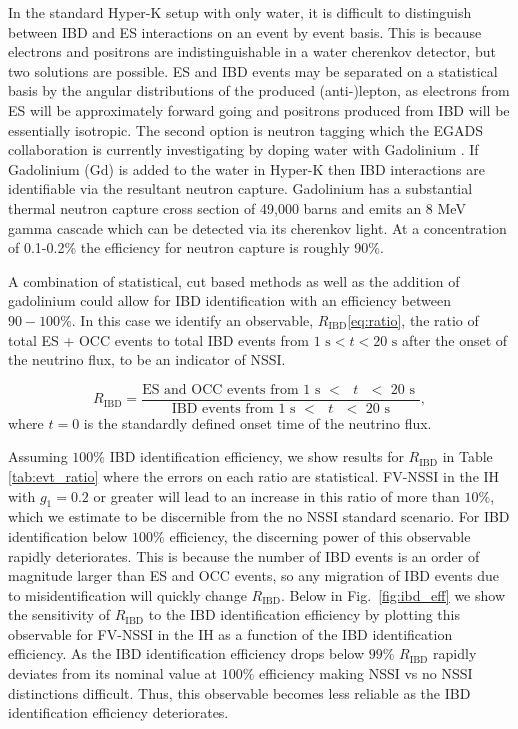 \documentclass[a4paper,12pt]{article}
\begin{document}
In the standard Hyper-K setup with only water, it is difficult to distinguish between IBD and ES interactions on an event by event basis. This is because electrons and positrons are indistinguishable in a water cherenkov detector, but two solutions are possible. ES and IBD events may be separated on a statistical basis by the angular distributions of the produced (anti-)lepton, as electrons from ES will be approximately forward going and positrons produced from IBD will be essentially isotropic. The second option is neutron tagging which the EGADS collaboration is currently investigating by doping water with Gadolinium \cite{Xu:2016cfv}. If Gadolinium (Gd) is added to the water in Hyper-K then IBD interactions are identifiable via the resultant neutron capture. Gadolinium has a substantial thermal neutron capture cross section of 49,000 barns and emits an 8 MeV gamma cascade which can be detected via its cherenkov light. At a concentration of 0.1-0.2\% the efficiency for neutron capture is roughly 90\%. 

A combination of statistical, cut based methods as well as the addition of gadolinium could allow for IBD identification with an efficiency between $90 - 100\%$. In this case we identify an observable, $R_{\text{IBD}}$\eqref{eq:ratio}, the ratio of total ES + OCC events to total IBD events from $1\text{ s} < t < 20\text{ s}$ after the onset of the neutrino flux, to be an indicator of NSSI. 

\begin{equation}
R_{\text{IBD}} = \frac{\text{ES and OCC events from 1 s $<$ $t$ $<$ 20 s }}{\text{IBD events from 1 s $<$ $t$ $<$ 20 s}},
\label{eq:ratio}
\end{equation}
where $t = 0$ is the standardly defined onset time of the neutrino flux.

Assuming $100\%$ IBD identification efficiency, we show results for $R_{\text{IBD}}$ in Table \ref{tab:evt_ratio} where the errors on each ratio are statistical. FV-NSSI in the IH with $g_{1} = 0.2$ or greater will lead to an increase in this ratio of more than $10\%$, which we estimate to be discernible from the no NSSI standard scenario. For IBD identification below $100\%$ efficiency, the discerning power of this observable rapidly deteriorates. This is because the number of IBD events is an order of magnitude larger than ES and OCC events, so any migration of IBD events due to misidentification will quickly change $R_{\text{IBD}}$. Below in Fig.~\ref{fig:ibd_eff} we show the sensitivity of $R_{\text{IBD}}$ to the IBD identification efficiency by plotting this observable for FV-NSSI in the IH as a function of the IBD identification efficiency. As the IBD identification efficiency drops below $99\%$ $R_{\text{IBD}}$ rapidly deviates from its nominal value at $100\%$ efficiency making NSSI vs no NSSI distinctions difficult. Thus, this observable becomes less reliable as the IBD identification efficiency deteriorates.
\end{document}
